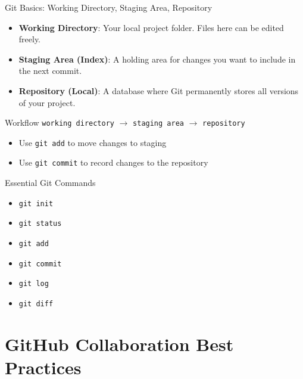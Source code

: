 \documentclass[12pt]{beamer}
\begin{document}
\begin{frame}{Git Basics: Working Directory, Staging Area, Repository}
  \begin{itemize}
      \item \textbf{Working Directory}: Your local project folder. Files here can be edited freely.
      \item \textbf{Staging Area (Index)}: A holding area for changes you want to include in the next commit.
      \item \textbf{Repository (Local)}: A database where Git permanently stores all versions of your project.
  \end{itemize}
  \vspace{1em}
  \begin{block}{Workflow}
  \texttt{working directory} $\rightarrow$ \texttt{staging area} $\rightarrow$ \texttt{repository}
  \end{block}
  \begin{itemize}
      \item Use \texttt{git add} to move changes to staging
      \item Use \texttt{git commit} to record changes to the repository
  \end{itemize}
  \end{frame}

\begin{frame}{Essential Git Commands}
    \begin{itemize}
      \item \texttt{git init}
      \item \texttt{git status}
      \item \texttt{git add}
      \item \texttt{git commit}
      \item \texttt{git log}
      \item \texttt{git diff}
    \end{itemize}
  \end{frame}


\section{GitHub Collaboration Best Practices}
\end{document}
